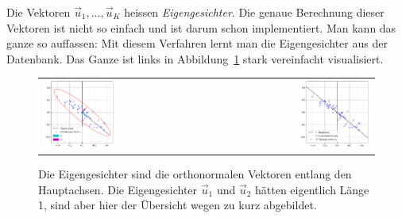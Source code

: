 Die Vektoren $\vec u_1,\ldots,\vec u_K$ heissen \textit{Eigengesichter}.
Die genaue Berechnung dieser Vektoren ist nicht so einfach und ist darum schon implementiert.
Man kann das ganze so auffassen: Mit diesem Verfahren \glqq{}lernt\grqq{} man die Eigengesichter aus der Datenbank.
Das Ganze ist links in Abbildung~\ref{fig:construction} stark vereinfacht visualisiert.
\begin{figure}[ht]
	\centering
	\begin{tabular}{lr}
		\includegraphics[width=0.45\textwidth]{images/facespace/principal_components} & \includegraphics[width=0.45\textwidth]{images/facespace/distance_complicated} \\
	\end{tabular}
	\caption{Die Eigengesichter sind die orthonormalen Vektoren entlang den Hauptachsen. Die Eigengesichter $\vec u_1$ und $\vec u_2$ hätten eigentlich Länge 1, sind aber hier der Übersicht wegen zu kurz abgebildet.}
	\label{fig:construction}
\end{figure}


